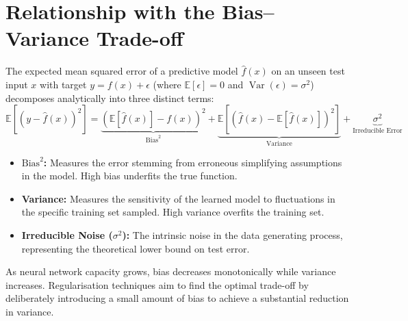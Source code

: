 \documentclass[12pt,a4paper]{article}
\begin{document}
\section{Relationship with the Bias--Variance Trade-off}
The expected mean squared error of a predictive model $\hat{f}(x)$ on an unseen test input $x$ with target $y = f(x) + \epsilon$ (where $\mathbb{E}[\epsilon]=0$ and $\operatorname{Var}(\epsilon)=\sigma^2$) decomposes analytically into three distinct terms:
\begin{equation}
\mathbb{E}\left[\left(y - \hat{f}(x)\right)^2\right] = \underbrace{\left(\mathbb{E}[\hat{f}(x)] - f(x)\right)^2}_{\text{Bias}^2} + \underbrace{\mathbb{E}\left[\left(\hat{f}(x) - \mathbb{E}[\hat{f}(x)]\right)^2\right]}_{\text{Variance}} + \underbrace{\sigma^2}_{\text{Irreducible Error}}
\end{equation}
\begin{itemize}[leftmargin=*]
    \item \textbf{$\text{Bias}^2$:} Measures the error stemming from erroneous simplifying assumptions in the model. High bias underfits the true function.
    \item \textbf{Variance:} Measures the sensitivity of the learned model to fluctuations in the specific training set sampled. High variance overfits the training set.
    \item \textbf{Irreducible Noise ($\sigma^2$):} The intrinsic noise in the data generating process, representing the theoretical lower bound on test error.
\end{itemize}
As neural network capacity grows, bias decreases monotonically while variance increases. Regularisation techniques aim to find the optimal trade-off by deliberately introducing a small amount of bias to achieve a substantial reduction in variance.

\begin{center}
\end{center}
\end{document}
